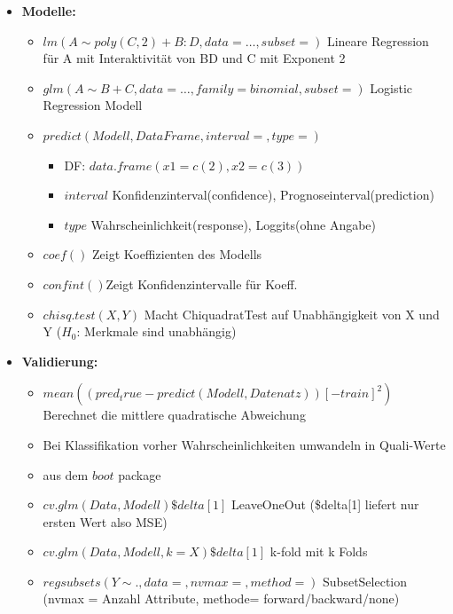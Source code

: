 \documentclass[a4paper]{article}
\begin{document}
\begin{landscape}
\begin{multicols}{3}
\begin{itemize} [noitemsep,nolistsep,leftmargin=*]
            \item \textbf{Modelle:}
            \begin{itemize}[noitemsep,nolistsep,leftmargin=*]
            \item $lm(A \sim  poly(C,2) + B:D, data = \dots, subset=)$ Lineare Regression für A mit Interaktivität von BD und C mit Exponent 2
            \item $glm(A \sim B + C, data=\dots, family = binomial, subset=)$ Logistic Regression Modell
            \item $predict(Modell, DataFrame, interval= , type= )$
                \begin{itemize}[noitemsep,nolistsep,leftmargin=*]
                    \item DF: $data.frame(x1 = c(2), x2 = c(3))$ 
                    \item $interval$ Konfidenzinterval(confidence), Prognoseinterval(prediction)
                    \item $type$ Wahrscheinlichkeit(response), Loggits(ohne Angabe)
                \end{itemize}
            \item $coef()$ Zeigt Koeffizienten des Modells
            \item $confint()$Zeigt  Konfidenzintervalle für Koeff.
            \item $chisq.test(X,Y)$ Macht ChiquadratTest auf Unabhängigkeit von X und Y ($H_0$: Merkmale sind unabhängig)
            \end{itemize}

            \item \textbf{Validierung:}
            \begin{itemize}[noitemsep,nolistsep,leftmargin=*]
                \item $mean((pred_true - predict(Modell, Datenatz))[-train]^2)$ Berechnet die mittlere quadratische Abweichung
                \item Bei Klassifikation vorher Wahrscheinlichkeiten umwandeln in Quali-Werte
                \item aus dem $boot$ package
                \item $cv.glm(Data,Modell)\$delta[1]$ LeaveOneOut (\$delta[1] liefert nur ersten Wert also MSE)
                \item $cv.glm(Data,Modell, k=X)\$delta[1]$ k-fold mit k Folds
                \item $regsubsets(Y \sim ., data = , nvmax =, method = )$ SubsetSelection (nvmax = Anzahl Attribute, methode= forward/backward/none)
            \end{itemize}


\end{itemize}
\end{multicols}
\end{landscape}
\end{document}
